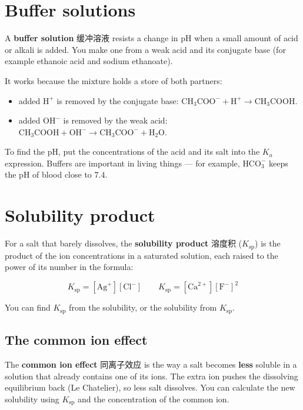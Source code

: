 \documentclass[11pt]{article}
\begin{document}
\section*{Buffer solutions}

A \textbf{buffer solution} 缓冲溶液 resists a change in pH when a small amount of acid or alkali is added. You make one from a weak acid and its conjugate base (for example ethanoic acid and sodium ethanoate).

It works because the mixture holds a store of both partners:

\begin{itemize}
\item added $\text{H}^+$ is removed by the conjugate base: $\text{CH}_3\text{COO}^- + \text{H}^+ \rightarrow \text{CH}_3\text{COOH}$.

\item added $\text{OH}^-$ is removed by the weak acid: $\text{CH}_3\text{COOH} + \text{OH}^- \rightarrow \text{CH}_3\text{COO}^- + \text{H}_2\text{O}$.

\end{itemize}

To find the pH, put the concentrations of the acid and its salt into the $K_a$ expression. Buffers are important in living things — for example, $\text{HCO}_3^-$ keeps the pH of blood close to $7.4$.

\section*{Solubility product}

For a salt that barely dissolves, the \textbf{solubility product} 溶度积 ($K_{\text{sp}}$) is the product of the ion concentrations in a saturated solution, each raised to the power of its number in the formula:

\[
K_{\text{sp}} = [\text{Ag}^+][\text{Cl}^-] \qquad K_{\text{sp}} = [\text{Ca}^{2+}][\text{F}^-]^2
\]

You can find $K_{\text{sp}}$ from the solubility, or the solubility from $K_{\text{sp}}$.

\subsection*{The common ion effect}

The \textbf{common ion effect} 同离子效应 is the way a salt becomes \textbf{less} soluble in a solution that already contains one of its ions. The extra ion pushes the dissolving equilibrium back (Le Chatelier), so less salt dissolves. You can calculate the new solubility using $K_{\text{sp}}$ and the concentration of the common ion.
\end{document}
